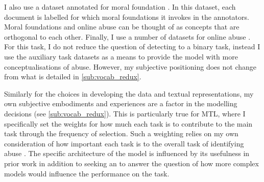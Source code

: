 {I also use a dataset annotated for moral foundation \citep{Hoover:2019}.
In this dataset, each document is labelled for which moral foundations it invokes in the annotators.
Moral foundations and online abuse can be thought of as concepts that are orthogonal to each other. 
Finally, I use a number of datasets for online abuse \citep{Garcia:2018,Waseem:2016,Waseem-Hovy:2016,Davidson:2017,Wulczyn:2016}.
For this task, I do not reduce the question of detecting to a binary task, instead I use the auxiliary task datasets as a means to provide the model with more conceptualisations of abuse.
However, my subjective positioning does not change from what is detailed in \autoref{sub:vocab_redux}.

Similarly for the choices in developing the data and textual representations, my own subjective embodiments and experiences are a factor in the modelling decisions (see \cref{sub:vocab_redux}).
This is particularly true for MTL, where I specifically set the weights for how much each task is to contribute to the main task through the frequency of selection.
Such a weighting relies on my own consideration of how important each task is to the overall task of identifying abuse .
The specific architecture of the model is influenced by its usefulness in prior work \citep{Bingel:2018} in addition to seeking an to answer the question of how more complex models would influence the performance on the task.

}
